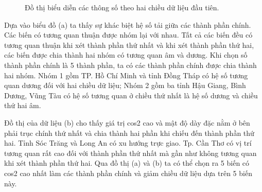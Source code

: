 \documentclass[../thesis.tex]{subfiles}
\begin{document}
\begin{landscape}
	\begin{figure}[H]
		\centering
		\caption{Đồ thị biểu diễn các thông số theo hai chiều dữ liệu đầu tiên.}
	\end{figure}

Dựa vào biểu đồ (a) ta thấy sự khác biệt hệ số tải giữa các thành phần chính. Các biến có tương quan thuận được nhóm lại với nhau. Tất cả các biến đều có tương quan thuận khi xét thành phần thứ nhất và khi xét thành phần thứ hai, các biến được chia thành hai nhóm có tương quan âm và dương. Khi chọn số thành phần chính là 5 thành phần, ta có các thành phần chính được chia thành hai nhóm. Nhóm 1 gồm TP. Hồ Chí Minh và tỉnh Đồng Tháp có hệ số tương quan dương đối với hai chiều dữ liệu; Nhóm 2 gồm ba tỉnh Hậu Giang, Bình Dương, Vũng Tàu có hệ số tương quan ở chiều thứ nhất là hệ số dương và chiều thứ hai âm. 

Đồ thị của dữ liệu (b) cho thấy giá trị cos2 cao và mật độ dày đặc nằm ở bên phải trục chính thứ nhất và chia thành hai phần khi chiếu đến thành phần thứ hai. Tỉnh Sóc Trăng và Long An có xu hướng trực giao. Tp. Cần Thơ có vị trí tương quan rất cao đối với thành phần thứ nhất mà gần như không tương quan khi xét thành phần thứ hai. Qua đồ thị (a) và (b) ta có thể chọn ra 5 biến có cos2 cao nhất làm các thành phần chính và giảm chiều dữ liệu dựa trên 5 biến này. 
	
\end{landscape}
\end{document}

